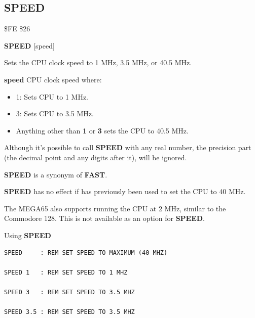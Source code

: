\subsection{SPEED}
\begin{description}[leftmargin=2cm,style=nextline]
\item [Token:]    \$FE \$26

\item [Format:]   {\bf SPEED} [speed]

\item [Usage:]    Sets the CPU clock speed to 1 MHz, 3.5 MHz, or 40.5 MHz.

                  {\bf speed} CPU clock speed where:
                  \begin{itemize}
                     \item 1: Sets CPU to 1 MHz.
                     \item 3: Sets CPU to 3.5 MHz.
                     \item Anything other than {\bf 1} or {\bf 3} sets the CPU to 40.5 MHz.
                  \end{itemize}

\item [Remarks:]  Although it's possible to call {\bf SPEED} with any real number, the precision part (the decimal point and any digits after it), will be ignored.

                  {\bf SPEED} is a synonym of {\bf FAST}.

                  {\bf SPEED} has no effect if  has previously been used to set the CPU to 40 MHz.

                  The MEGA65 also supports running the CPU at 2 MHz, similar to the Commodore 128. This is not available as an option for {\bf SPEED}.

\item [Examples:] Using {\bf SPEED}

\begin{tcolorbox}[colback=black,coltext=white]
\verbatimfont{\codefont}
\begin{verbatim}
SPEED     : REM SET SPEED TO MAXIMUM (40 MHZ)

SPEED 1   : REM SET SPEED TO 1 MHZ

SPEED 3   : REM SET SPEED TO 3.5 MHZ

SPEED 3.5 : REM SET SPEED TO 3.5 MHZ
\end{verbatim}
\end{tcolorbox}
\end{description}


